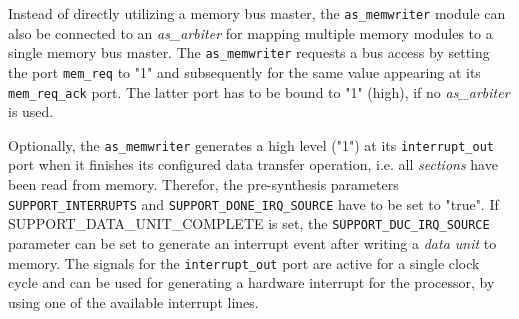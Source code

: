 Instead of directly utilizing a memory bus master, the \texttt{as\_memwriter} module can also be connected to an \textit{as\_arbiter} for mapping multiple \asterics memory modules to a single memory bus master.
The \texttt{as\_memwriter} requests a bus access by setting the port \texttt{mem\_req} to "1" and subsequently for the same value appearing at its \texttt{mem\_req\_ack} port.
The latter port has to be bound to "1" (high), if no \textit{as\_arbiter} is used.


Optionally, the \texttt{as\_memwriter} generates a high level ("1") at its \texttt{interrupt\_out} port when it finishes its configured data transfer operation, i.e. all \textit{sections} have been read from memory.
Therefor, the pre-synthesis parameters \texttt{SUPPORT\_INTERRUPTS} and \texttt{SUPPORT\_DONE\_IRQ\_SOURCE} have to be set to "true".
If {SUPPORT\_DATA\_UNIT\_COMPLETE} is set, the \texttt{SUPPORT\_DUC\_IRQ\_SOURCE} parameter can be set to generate an interrupt event after writing a \textit{data unit} to memory.
The signals for the \texttt{interrupt\_out} port are active for a single clock cycle and can be used for generating a hardware interrupt for the processor, by using one of the available interrupt lines.


